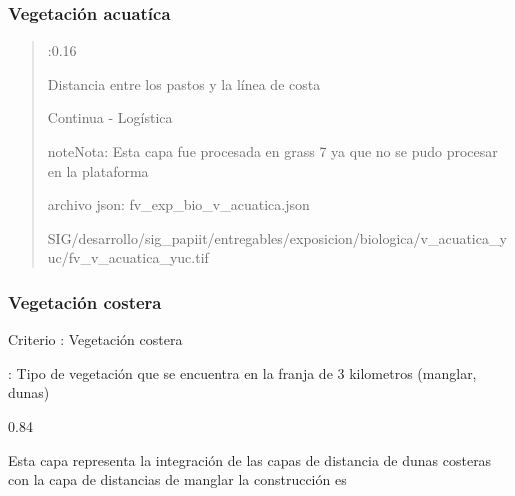 \documentclass[letterpaper,10pt,spanish]{sphinxmanual}
\begin{document}
\subsubsection{Vegetación acuatíca}
\label{\detokenize{exposicion:vegetacion-acuatica}}\begin{quote}


:0.16


 Distancia entre los pastos y la línea de costa


  Continua - Logística

\begin{sphinxadmonition}{note}{Nota:}
Esta capa fue procesada en grass 7 ya que no se pudo procesar en la
plataforma
\end{sphinxadmonition}

archivo json: fv\_exp\_bio\_v\_acuatica.json


\noindent{}

 SIG/desarrollo/sig\_papiit/entregables/exposicion/biologica/v\_acuatica\_yuc/fv\_v\_acuatica\_yuc.tif


\end{quote}


\subsubsection{Vegetación costera}
\label{\detokenize{exposicion:vegetacion-costera}}

Criterio : Vegetación costera

: Tipo de vegetación que se encuentra en la franja de 3 kilometros (manglar, dunas)

 0.84

Esta capa representa la integración de las capas de distancia de dunas costeras con la capa de distancias de manglar
la construcción es
\end{document}
